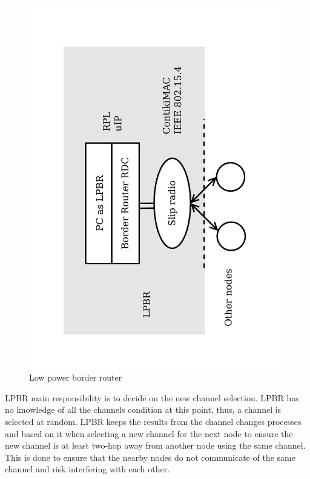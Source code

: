 \begin{figure}
\centering
\includegraphics[trim=2cm 2cm 3cm 2cm, clip=true, totalheight=0.45\textheight, angle=270]{BR2.pdf}
\caption{Low power border router}
\label{fig_lpbr}
\end{figure}


LPBR main responsibility is to decide on the new channel selection. LPBR has no knowledge of all the channels condition at this point, thus, a channel is selected at random. LPBR keeps the results from the channel changes processes and based on it when selecting a new channel for the next node to ensure the new channel is at least two-hop away from another node using the same channel. This is done to ensure that the nearby nodes do not communicate of the same channel and risk interfering with each other.

